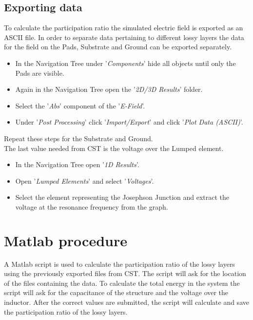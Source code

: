 \subsection{Exporting data}
To calculate the participation ratio the simulated electric field is exported as an ASCII file. In order to separate data pertaining to different lossy layers the data for the field on the Pads, Substrate and Ground can be exported separately. 
\begin{itemize}
	\item In the Navigation Tree under '\textit{Components}' hide all objects until only the Pads are visible.
	\item Again in the Navigation Tree open the '\textit{2D/3D Results}' folder.
	\item Select the '\textit{Abs}' component of the '\textit{E-Field}'.
	\item Under '\textit{Post Processing}' click '\textit{Import/Export}' and click '\textit{Plot Data (ASCII)}'. 
\end{itemize}
Repeat these steps for the Substrate and Ground. \\
The last value needed from CST is the voltage over the Lumped element.
\begin{itemize}
	\item In the Navigation Tree open '\textit{1D Results}'.
	\item Open '\textit{Lumped Elements}' and select '\textit{Voltages}'.
	\item Select the element representing the Josephson Junction and extract the voltage at the resonance frequency from the graph.   
\end{itemize}

\section{Matlab procedure}
A Matlab script is used to calculate the participation ratio of the lossy layers using the previously exported files from CST. The script will ask for the location of the files containing the data. To calculate the total energy in the system the script will ask for the capacitance of the structure and the voltage over the inductor. After the correct values are submitted, the script will calculate and save the participation ratio of the lossy layers. 